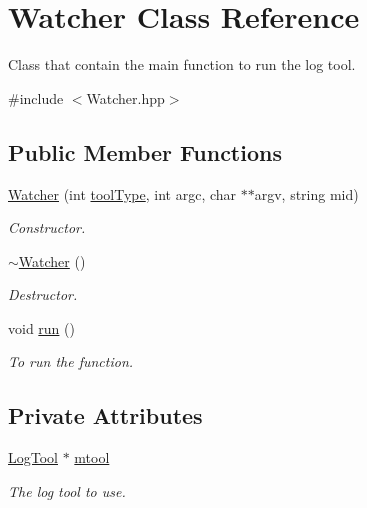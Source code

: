 \hypertarget{classWatcher}{
\section{Watcher Class Reference}
\label{classWatcher}
}


Class that contain the main function to run the log tool.  




{\ttfamily \#include $<$Watcher.hpp$>$}

\subsection*{Public Member Functions}
\begin{DoxyCompactItemize}
\item 
\hyperlink{classWatcher_a3981e0d589b1af316127032801a7c899}{Watcher} (int \hyperlink{ToolFactory_8hpp_af38da7cd279ad8cef1a3db2cbd4c1744}{toolType}, int argc, char $\ast$$\ast$argv, string mid)
\begin{DoxyCompactList}\small\item\em Constructor. \item\end{DoxyCompactList}\item 
\hypertarget{classWatcher_a84db4a7c7f7c7d3a62104713920678c8}{
\hyperlink{classWatcher_a84db4a7c7f7c7d3a62104713920678c8}{$\sim$Watcher} ()}
\label{classWatcher_a84db4a7c7f7c7d3a62104713920678c8}

\begin{DoxyCompactList}\small\item\em Destructor. \item\end{DoxyCompactList}\item 
\hypertarget{classWatcher_af62b1c9db7b409d7a485f993a4c032ec}{
void \hyperlink{classWatcher_af62b1c9db7b409d7a485f993a4c032ec}{run} ()}
\label{classWatcher_af62b1c9db7b409d7a485f993a4c032ec}

\begin{DoxyCompactList}\small\item\em To run the function. \item\end{DoxyCompactList}\end{DoxyCompactItemize}
\subsection*{Private Attributes}
\begin{DoxyCompactItemize}
\item 
\hypertarget{classWatcher_a25d780e9266771f8e9bcbf89e510d414}{
\hyperlink{classLogTool}{LogTool} $\ast$ \hyperlink{classWatcher_a25d780e9266771f8e9bcbf89e510d414}{mtool}}
\label{classWatcher_a25d780e9266771f8e9bcbf89e510d414}

\begin{DoxyCompactList}\small\item\em The log tool to use. \item\end{DoxyCompactList}\end{DoxyCompactItemize}


